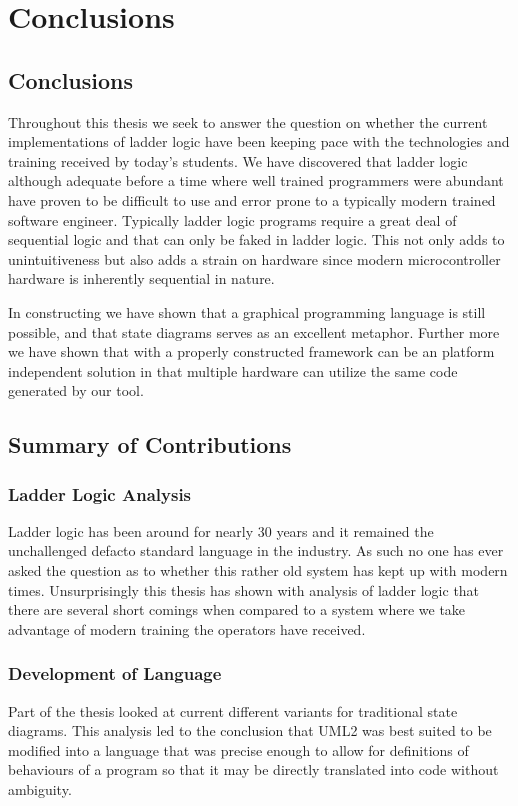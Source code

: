 \section{Conclusions}

\subsection{Conclusions}

Throughout this thesis we seek to answer the question on whether the current implementations of ladder logic have been keeping pace with the technologies and training received by today's students. We have discovered that ladder logic although adequate before a time where well trained programmers were abundant have proven to be difficult to use and error prone to a typically modern trained software engineer. Typically ladder logic programs require a great deal of sequential logic and that can only be faked in ladder logic. This not only adds to unintuitiveness but also adds a strain on hardware since modern microcontroller hardware is inherently sequential in nature.

In constructing \plccharts we have shown that a graphical programming language is still possible, and that state diagrams serves as an excellent metaphor. Further more we have shown that with a properly constructed framework \plccharts can be an platform independent solution in that multiple hardware can utilize the same  code generated by our tool. 


\subsection{Summary of Contributions}

\subsubsection{Ladder Logic Analysis}
Ladder logic has been around for nearly 30 years and it remained the unchallenged defacto standard language in the industry. As such no one has ever asked the question as to whether this rather old system has kept up with modern times. Unsurprisingly this thesis has shown with analysis of ladder logic that there are several short comings when compared to a system where we take advantage of modern training the operators have received. 


\subsubsection{Development of \plccharts Language}
Part of the thesis looked at current different variants for traditional state diagrams. This analysis led to the conclusion that UML2 was best suited to be modified into a language that was precise enough to allow for definitions of behaviours of a program so that it may be directly translated into code without ambiguity.

